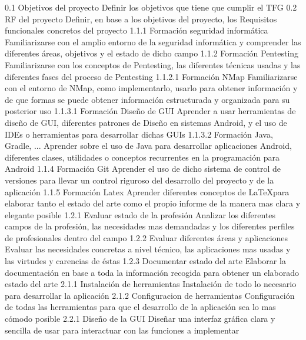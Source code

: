 \taskframe
	{0.1}
	{Objetivos del proyecto}
	{Definir los objetivos que tiene que cumplir el TFG}
	{}
\taskframe
	{0.2}
	{RF del proyecto}
	{Definir, en base a los objetivos del proyecto, los Requisitos funcionales concretos del proyecto}
	{}
\taskframe
	{1.1.1}
	{Formación seguridad informática}
	{Familiarizarse con el amplio entorno de la seguridad informática y comprender las diferentes áreas, objetivos y el estado de dicho campo}
	{}
\taskframe
	{1.1.2}
	{Formación Pentesting}
	{Familiarizarse con los conceptos de Pentesting, las diferentes técnicas usadas y las diferentes fases del proceso de Pentesting}
	{}
\taskframe
	{1.1.2.1}
	{Formación NMap}
	{Familiarizarse con el entorno de NMap, como implementarlo, usarlo para obtener información y de que formas se puede obtener información estructurada y organizada para su posterior uso}
	{}
\taskframe
	{1.1.3.1}
	{Formación Diseño de GUI}
	{Aprender a usar herramientas de diseño de GUI, diferentes patrones de Diseño en sistemas Android, y el uso de IDEs o herramientas para desarrollar dichas GUIs}
	{}
\taskframe
	{1.1.3.2}
	{Formación Java, Gradle, ...}
	{Aprender sobre el uso de Java para desarrollar aplicaciones Android, diferentes clases, utilidades o conceptos recurrentes en la programación para Android}
	{}
\taskframe
	{1.1.4}
	{Formación Git}
	{Aprender el uso de dicho sistema de control de versiones para llevar un control riguroso del desarrollo del proyecto y de la aplicación}
	{}
\taskframe
	{1.1.5}
	{Formación Latex}
	{Aprender diferentes conceptos de \LaTeX para elaborar tanto el estado del arte como el propio informe de la manera mas clara y elegante posible}
	{}
\taskframe
	{1.2.1}
	{Evaluar estado de la profesión}
	{Analizar los diferentes campos de la profesión, las necesidades mas demandadas y los diferentes perfiles de profesionales dentro del campo}
	{}
\taskframe
	{1.2.2}
	{Evaluar diferentes áreas y aplicaciones}
	{Evaluar las necesidades concretas a nivel técnico, las aplicaciones mas usadas y las virtudes y carencias de éstas}
	{}
\taskframe
	{1.2.3}
	{Documentar estado del arte}
	{Elaborar la documentación en base a toda la información recogida para obtener un elaborado estado del arte}
	{}
\taskframe
	{2.1.1}
	{Instalación de herramientas}
	{Instalación de todo lo necesario para desarrollar la aplicación}
	{}
\taskframe
	{2.1.2}
	{Configuracion de herramientas}
	{Configuración de todas las herramientas para que el desarrollo de la aplicación sea lo mas cómodo posible}
	{}
\taskframe
	{2.2.1}
	{Diseño de la GUI}
	{Diseñar una interfaz gráfica clara y sencilla de usar para interactuar con las funciones a implementar}
